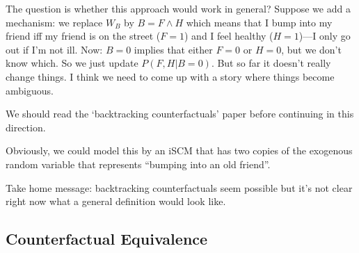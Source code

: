 {\begin{Eg}
The question is whether this approach would work in general?
Suppose we add a mechanism: we replace $W_B$ by $B = F \land H$ which means that I bump into my friend iff my friend is on the street ($F=1$) and I feel healthy ($H=1$)---I only go out if I'm not ill.
Now: $B=0$ implies that either $F=0$ or $H=0$, but we don't know which.
So we just update $P(F,H|B=0)$.
But so far it doesn't really change things.
I think we need to come up with a story where things become ambiguous.

We should read the `backtracking counterfactuals' paper before continuing in this direction.
\end{Eg}
Obviously, we could model this by an iSCM that has two copies of the exogenous random variable that represents ``bumping into an old friend''.

Take home message: backtracking counterfactuals seem possible but it's not clear right now what a general definition would
look like.
}

\subsection{Counterfactual Equivalence}


